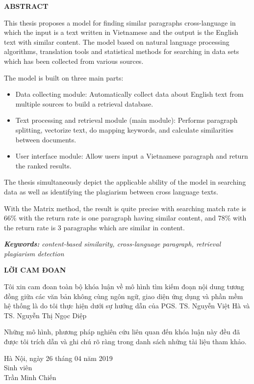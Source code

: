 \documentclass[12pt]{report}
\begin{document}
\newpage
\begin{center}
	\textbf{\large ABSTRACT}
\end{center}

This thesis proposes a model for finding similar paragraphs cross-language in which the input is a text written in Vietnamese and the output is the English text with similar content.
The model based on natural language processing algorithms, translation tools and statistical methods for searching in data sets which has been collected from various sources.

The model is built on three main parts:
\begin{itemize}
	\item Data collecting module: Automatically collect data about English text from multiple sources to build a retrieval database.
	\item Text processing and retrieval module (main module): Performs paragraph splitting, vectorize text, do mapping keywords, and calculate similarities between documents.
	\item User interface module: Allow users input a Vietnamese paragraph and return the ranked results.
\end{itemize}
The thesis simultaneously depict the applicable ability of the model in searching data as well as identifying the plagiarism between cross language texts.

With the Matrix method, the result is quite precise with searching match rate is 66\% with the return rate is one paragraph having similar content, and 78\% with the return rate is 3 paragraphs which are similar in content.

\noindent \textit{\textbf{Keywords:} content-based similarity, cross-language paragraph, retrieval plagiarism detection}

\newpage
\begin{center}
	\textbf{\large LỜI CAM ĐOAN}
\end{center}
Tôi xin cam đoan toàn bộ khóa luận về mô hình tìm kiếm đoạn nội dung tương đồng giữa các văn bản không cùng ngôn ngữ, giao diện ứng dụng và phần mềm hệ thống là do tôi thực hiện dưới sự hướng dẫn của PGS. TS. Nguyễn Việt Hà và TS. Nguyễn Thị Ngọc Diệp

Những mô hình, phương pháp nghiên cứu liên quan đến khóa luận này đều đã được tôi trích dẫn và ghi chú rõ ràng trong danh sách những tài liệu tham khảo.

\begin{flushright}
	\begin{varwidth}{\linewidth}\centering
		Hà Nội, ngày 26 tháng 04 năm 2019\\
		Sinh viên\\[2cm]
		Trần Minh Chiến
	\end{varwidth}
\end{flushright}
\end{document}
